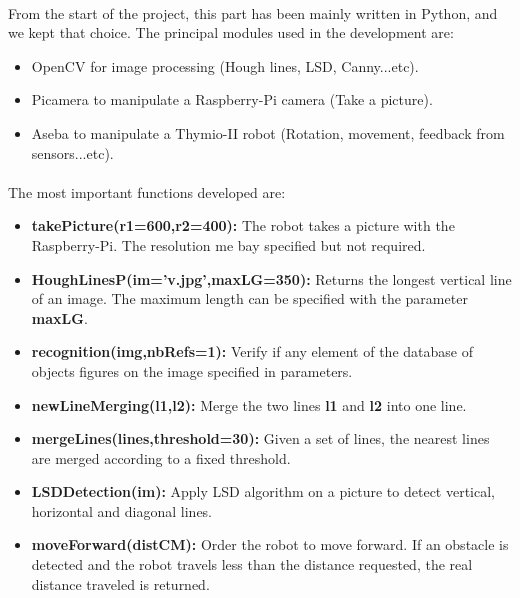 \documentclass[12pt]{report}
\begin{document}
\paragraph{}
From the start of the project, this part has been mainly written in Python, and we kept that choice. The principal modules used in the development are:
\begin{itemize}
    \item OpenCV for image processing (Hough lines, LSD, Canny...etc).
    \item Picamera to manipulate a Raspberry-Pi camera (Take a picture).
    \item Aseba to manipulate a Thymio-II robot (Rotation, movement, feedback from sensors...etc).
\end{itemize}
\paragraph{}
The most important functions developed are:
\begin{itemize}
    \item \textbf{takePicture(r1=600,r2=400):} The robot takes a picture with the Raspberry-Pi. The resolution me bay specified but not required.
    \item  \textbf{HoughLinesP(im='v.jpg',maxLG=350):} Returns the longest vertical line of an image. The maximum length can be specified with the parameter \textbf{maxLG}.
    \item \textbf{recognition(img,nbRefs=1):} Verify if any element of the database of objects figures on the image specified in parameters.
    \item \textbf{newLineMerging(l1,l2):} Merge the two lines \textbf{l1} and \textbf{l2} into one line.
    \item \textbf{mergeLines(lines,threshold=30):} Given a set of lines, the nearest lines are merged according to a fixed threshold.
    \item \textbf{LSDDetection(im):} Apply LSD algorithm on a picture to detect vertical, horizontal and diagonal lines.
    \item \textbf{moveForward(distCM):} Order the robot to move forward. If an obstacle is detected and the robot travels less than the distance requested, the real distance traveled is returned.
    
\end{itemize}
\end{document}
